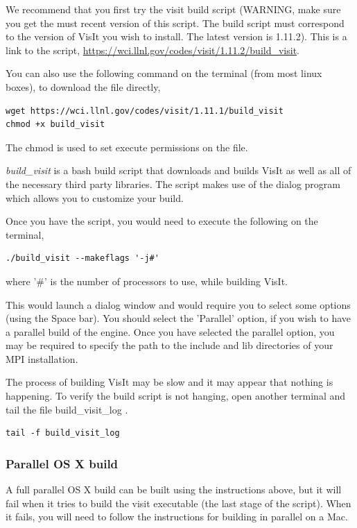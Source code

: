 \documentclass[12pt]{article}
\begin{document}
We recommend that you first try the visit build script (WARNING, make
sure you get the must recent version of this script. The build script
must correspond to the version of VisIt you wish to install. The
latest version is 1.11.2). This is a link to the script,
\url{https://wci.llnl.gov/codes/visit/1.11.2/build\_visit}.

You can also use the following command on the terminal (from most
linux boxes), to download the file directly,

\begin{verbatim}
wget https://wci.llnl.gov/codes/visit/1.11.1/build_visit
chmod +x build_visit
\end{verbatim}
The chmod is used to set execute permissions on the file.

\emph{build\_visit} is a bash build script that downloads and builds VisIt as
well as all of the necessary third party libraries. The script makes
use of the dialog program which allows you to customize your build.

Once you have the script, you would need to execute the following on
the terminal,

\begin{verbatim}
./build_visit --makeflags '-j#'
\end{verbatim}
where '\#' is the number of processors to use, while building VisIt.

This would launch a dialog window and would require you to select some
options (using the Space bar). You should select the 'Parallel'
option, if you wish to have a parallel build of the engine. Once you
have selected the parallel option, you may be required to specify the
path to the include and lib directories of your MPI installation.

The process of building VisIt may be slow and it may appear that
nothing is happening. To verify the build script is not hanging, open
another terminal and tail the file build\_visit\_log .

\begin{verbatim}
tail -f build_visit_log
\end{verbatim}

\normalfont  
\subsubsection{Parallel OS X build}
\label{sec:ParallelOSXBuild}

A full parallel OS X build can be built using the instructions above,
but it will fail when it tries to build the visit executable (the last
stage of the script). When it fails, you will need to follow the
instructions for building in parallel on a Mac.
\end{document}
